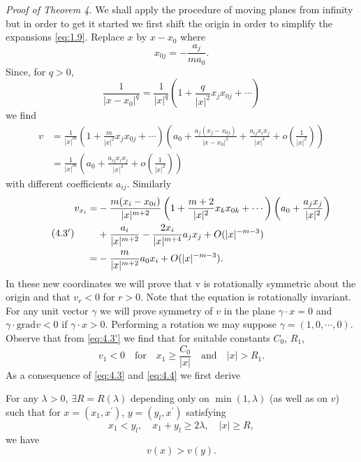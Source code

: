\noindent
\textit{Proof of Theorem 4.} 
	We shall apply the procedure of moving planes from infinity but in order to get it started
  we first shift the origin in order to simplify the expansions \eqref{eq:1.9}.
  Replace $x$ by $x-x_0$ where
	\begin{equation}\label{eq:4.2}
		x_{0j} = -\frac{a_j}{ma_0}.
	\end{equation}
	Since, for $q > 0$,
	\[ \frac{1}{|x-x_0|^q} = \frac{1}{|x|^q} \left( 1+\frac{q}{|x|^2}x_jx_{0j}+\cdots \right) \]
	we find
	\begin{equation}\label{eq:4.3}
		\begin{aligned}
			v &= \frac{1}{|x|^m} \left(1+\frac{m}{|x|^2}x_jx_{0j}+\cdots\right) \left( a_0+\frac{a_j(x_j-x_{0j})}{|x-x_0|^2} + \frac{a_{ij}x_ix_j}{|x|^4} + o\left(\frac{1}{|x|^2}\right) \right)\\
			&= \frac{1}{|x|^m} \left( a_0 + \frac{a_{ij}x_ix_j}{|x|^4} + o\left(\frac{1}{|x|^2}\right) \right)
		\end{aligned}
	\end{equation}
	with different coefficients $a_{ij}$. Similarly
	\begin{equation}\tag{4.3$^{\prime}$}\label{eq:4.3'}
		\begin{aligned}
			v_{x_i} =& -\frac{m(x_i-x_{0i})}{|x|^{m+2}} \left( 1+\frac{m+2}{|x|^2} x_kx_{0k} +\cdots \right) \left( a_0+\frac{a_jx_j}{|x|^2} \right)\\
			&+ \frac{a_i}{|x|^{m+2}} - \frac{2x_i}{|x|^{m+4}} a_jx_j + O(|x|^{-m-3})\\
			=& -\frac{m}{|x|^{m+2}} a_0x_i + O(|x|^{-m-3}).
		\end{aligned}
	\end{equation}
	In these new coordinates we will prove that v is rotationally symmetric about the origin and that $v_r < 0$ for $r > 0$. Note that the equation is rotationally invariant. For any unit vector $\gamma$ we will prove symmetry of $v$ in the plane $\gamma\cdot x=0$ and $\gamma\cdot\mathrm{grad}v<0$ if $\gamma\cdot x>0$. Performing a rotation we may suppose $\gamma=(1,0,\cdots, 0)$. Observe that from \eqref{eq:4.3'} we find that for suitable constants $C_0$, $R_1$,
	\begin{equation}\label{eq:4.4}
		v_1 <0 \quad\text{for}\quad x_1\geq \frac{C_0}{|x|} \quad\text{and} \quad |x|>R_1.
	\end{equation}
	As a consequence of \eqref{eq:4.3} and \eqref{eq:4.4} we first derive
 \begin{lemma}\label{lem:4.1}
		For any $\lambda >0$, $\exists R=R(\lambda)$ depending only on $\min (1, \lambda)$ (as well as on $v$) such that for $x = (x_1, x^{\prime})$, $y = (y_l, x^{\prime})$ satisfying
		\[ x_1<y_l,\quad x_1 +y_l \geq  2\lambda,\quad |x|\geq  R, \]
		we have
		\begin{equation}\label{eq:4.5}
			v(x) > v(y). 
		\end{equation}
\end{lemma}

